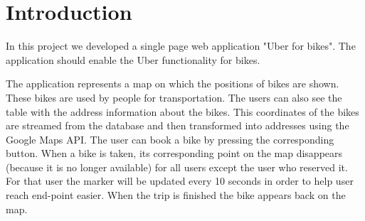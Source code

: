\section{Introduction}

In this project we developed a single page web application "Uber for bikes". The application should enable the Uber functionality for bikes.

The application represents a map on which the positions of bikes are shown. These bikes are used by people
for transportation. The users can also see the table with the address information about the bikes. This coordinates of the bikes are streamed from the database and then transformed into addresses using the Google Maps API. The user can book a bike by pressing the corresponding button. When a bike is taken, its corresponding point on the map disappears (because it is no longer available) for all users except the user who reserved it. For that user the marker will be updated every 10 seconds in order to help user reach end-point easier. When the trip is finished the bike appears back on the map. 
